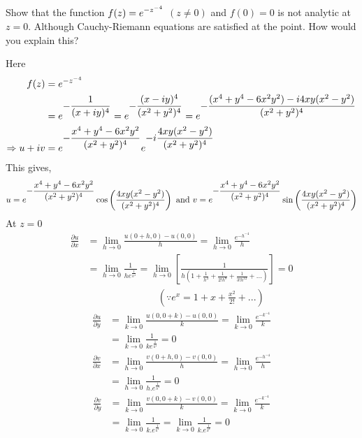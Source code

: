 \begin{example}
Show that the function $\displaystyle f(z)=e^{{-z}^{-4}}$ $(z\neq 0)$ and $f(0)=0$ is not analytic at $z=0$. Although Cauchy-Riemann equations are satisfied at the point. How would you explain this?
\end{example}
\begin{solution}
Here 
\begin{align*}
        f(z) &= e^{-z^{-4}} \\
        &=e^{\displaystyle -\frac{1}{(x+iy)^4}} = e^{ \displaystyle-\frac{(x-iy)^4}{(x^2+y^2)^4}} = e^{\displaystyle -\frac{(x^4+y^4-6x^2y^2)-i4xy(x^2-y^2)}{(x^2+y^2)^4}} \\
\Rightarrow u+iv  &= e^{\displaystyle -\frac{x^4+y^4-6x^2y^2}{(x^2+y^2)^4}}e^{\displaystyle -i\frac{4xy(x^2-y^2)}{(x^2+y^2)^4}}
\end{align*}
This gives,
\[ u = e^{\displaystyle -\frac{x^4+y^4-6x^2y^2}{(x^2+y^2)^4}} \cos \left(\frac{4xy(x^2-y^2)}{(x^2+y^2)^4}\right) \text{ and } v = e^{\displaystyle -\frac{x^4+y^4-6x^2y^2}{(x^2+y^2)^4}} \sin \left(\frac{4xy(x^2-y^2)}{(x^2+y^2)^4}\right)\]
At $z=0$
\begin{align*}
\frac{\partial u}{\partial x} & =\lim_{h\rightarrow0}\frac{u(0+h,0)-u(0,0)}{h}=\lim_{h\rightarrow0}\frac{e^{-h^{-4}}}{h}\\
 & =\lim_{h\rightarrow0}\frac{1}{he^{\frac{1}{h^{4}}}}=\lim_{h\rightarrow0}\left[\frac{1}{h\left(1+\frac{1}{h^{4}}+\frac{1}{2!h^{8}}+\frac{1}{3!h^{12}}+...\right)}\right]=0\\
 & \;\;\;\;\;\;\;\;\;\;\;\;\;\;\;\;\;\;\;\;\;\;\;\;\;\;(\because e^{x}=1+x+\frac{x^{2}}{2!}+...)
\end{align*}
\begin{align*}
\frac{\partial u}{\partial y} & =\lim_{k\rightarrow0}\frac{u(0,0+k)-u(0,0)}{k}=\lim_{k\rightarrow0}\frac{e^{-k^{-4}}}{k}\\
 & =\lim_{k\rightarrow0}\frac{1}{ke^{\frac{1}{k^{4}}}}=0\end{align*}
\begin{align*}
\frac{\partial v}{\partial x} & =\lim_{h\rightarrow0}\frac{v(0+h,0)-v(0,0)}{h}=\lim_{h\rightarrow0}\frac{e^{-h^{-4}}}{h}\\
 & =\lim_{h\rightarrow0}\frac{1}{h.e^{\frac{1}{h^{4}}}}=0\end{align*}
\begin{align*}
\frac{\partial v}{\partial y} & =\lim_{k\rightarrow0}\frac{v(0,0+k)-v(0,0)}{k}=\lim_{k\rightarrow0}\frac{e^{-k^{-4}}}{k}\\
 & =\lim_{k\rightarrow0}\frac{1}{k.e^{\frac{1}{k^{4}}}}=\lim_{k\rightarrow0}\frac{1}{k.e^{\frac{1}{k^{4}}}}=0\end{align*}



\end{solution}
